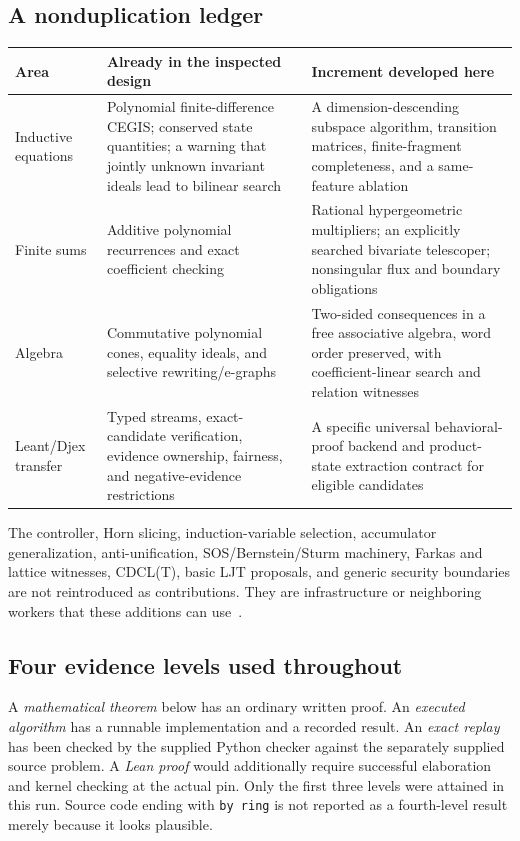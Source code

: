 \documentclass[11pt,letterpaper]{article}
\newcommand{\code}[1]{\texttt{#1}}
\theoremstyle{definition}\newtheorem{definition}[theorem]{Definition}
\theoremstyle{remark}\newtheorem{remark}[theorem]{Remark}
\begin{document}
\subsection{A nonduplication ledger}
\begin{table}[tbp]\small\centering
\begin{tabular}{@{}p{}p{}p{}@{}}
\toprule
Area & Already in the inspected design & Increment developed here\\
\midrule
Inductive equations & Polynomial finite-difference CEGIS; conserved state
quantities; a warning that jointly unknown invariant ideals lead to bilinear
search & A dimension-descending subspace algorithm, transition matrices,
finite-fragment completeness, and a same-feature ablation\\
Finite sums & Additive polynomial recurrences and exact coefficient checking &
Rational hypergeometric multipliers; an explicitly searched bivariate
telescoper; nonsingular flux and boundary obligations\\
Algebra & Commutative polynomial cones, equality ideals, and selective
rewriting/e-graphs & Two-sided consequences in a free associative algebra, word
order preserved, with coefficient-linear search and relation witnesses\\
Leant/Djex transfer & Typed streams, exact-candidate verification, evidence
ownership, fairness, and negative-evidence restrictions & A specific universal
behavioral-proof backend and product-state extraction contract for eligible
candidates\\
\bottomrule
\end{tabular}
\end{table}

The controller, Horn slicing, induction-variable selection, accumulator
generalization, anti-unification, SOS/Bernstein/Sturm machinery, Farkas and
lattice witnesses, CDCL(T), basic LJT proposals, and generic security boundaries
are not reintroduced as contributions. They are infrastructure or neighboring
workers that these additions can use~\cite{forge-structural,forge-nonlinear,
forge-external,forge-integration}.

\subsection{Four evidence levels used throughout}
A \emph{mathematical theorem} below has an ordinary written proof. An
\emph{executed algorithm} has a runnable implementation and a recorded result.
An \emph{exact replay} has been checked by the supplied Python checker against
the separately supplied source problem. A \emph{Lean proof} would additionally
require successful elaboration and kernel checking at the actual pin.
Only the first three levels were attained in this run. Source code ending with
\code{by ring} is not reported as a fourth-level result merely because it looks
plausible.
\end{document}
